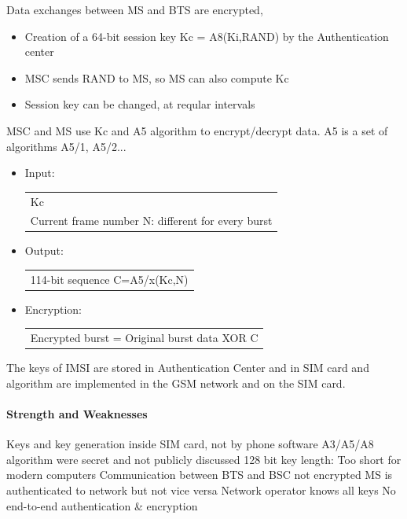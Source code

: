 \begin{itemize}
        Data exchanges between MS and BTS are encrypted,
        \begin{itemize}
            \item Creation of a 64-bit session key Kc = A8(Ki,RAND) by the 
                Authentication center
            \item MSC sends RAND to MS, so MS can also compute Kc
            \item Session key can be changed, at reqular intervals
        \end{itemize}
        MSC and MS use Kc and A5 algorithm to encrypt/decrypt data.
        A5 is a set of algorithms A5/1, A5/2...
        \begin{itemize}
            \item Input:
                \begin{tabular}{m{10cm}}
                    Kc\\
                    Current frame number N: different for every burst
                \end{tabular}
            \item Output:
                \begin{tabular}{m{10cm}}
                    114-bit sequence C=A5/x(Kc,N)
                \end{tabular}

            \item Encryption:
                \begin{tabular}{m{10cm}}
                    Encrypted burst = Original burst data XOR C
                \end{tabular}
        \end{itemize}
\end{itemize}

The keys of IMSI are stored in Authentication Center and in SIM card
and algorithm are implemented in the GSM network and on the SIM
card.

\paragraph{Strength and Weaknesses}
\begin{itemize}
        \proitem{} Keys and key generation inside SIM card, not by phone software
		\consitem{} A3/A5/A8 algorithm were secret and not publicly discussed
		\consitem{} 128 bit key length: Too short for modern computers
		\consitem{} Communication between BTS and BSC not encrypted
		\consitem{} MS is authenticated to network but not vice versa
		\consitem{} Network operator knows all keys
		\consitem{} No end-to-end authentication \& encryption
\end{itemize}

